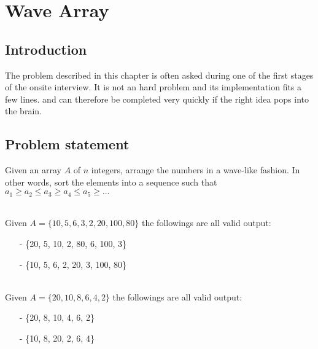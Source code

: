 %

\chapter{Wave Array}
\label{ch:wave_array}
\section*{Introduction}
The problem described in this chapter is often asked during one of the first stages of the onsite interview. It is not an hard problem and its implementation fits a few lines. and can therefore be completed very quickly if the right idea pops into the brain. 

\section{Problem statement}
\begin{exercise}
Given an array $A$ of $n$ integers, arrange the numbers in a wave-like fashion. 
In other words, sort the elements into a sequence such that $a_1 \geq a_2 \leq a_3 \geq a_4 \leq a_5 \geq \ldots$
\end{exercise}


\begin{example}
	\hfill \\
	Given $A= \{10, 5, 6, 3, 2, 20, 100, 80\}$ the followings are all valid output:
	\begin{itemize}
		\item[-]  \{20, 5, 10, 2, 80, 6, 100, 3\}
		\item[-]  \{10, 5, 6, 2, 20, 3, 100, 80\}
	\end{itemize}
\end{example}

\begin{example}
	\hfill \\
		Given $A= \{20, 10, 8, 6, 4, 2\}$ the followings are all valid output:
	\begin{itemize}
		\item[-] \{20, 8, 10, 4, 6, 2\}
		\item[-]  \{10, 8, 20, 2, 6, 4\}
	\end{itemize}
	
\end{example}

